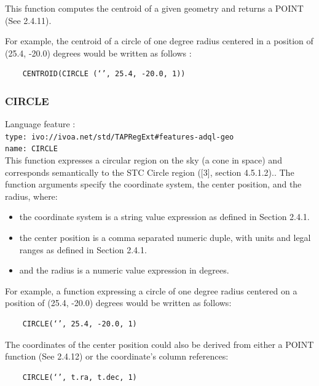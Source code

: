 \documentclass[11pt,a4paper]{ivoa}
\begin{document}
This function computes the centroid of a given geometry and returns a POINT
(See 2.4.11).

For example, the centroid of a circle of one degree radius centered in a
position of (25.4, -20.0) degrees would be written as follows :

\begin{verbatim}
    CENTROID(CIRCLE (‘’, 25.4, -20.0, 1))
\end{verbatim}

\subsubsection{CIRCLE}
\label{sec:geom.functions.circle}
{\footnotesize Language feature :}\\
{\footnotesize \verb|type: ivo://ivoa.net/std/TAPRegExt#features-adql-geo|}\\
{\footnotesize \verb|name: CIRCLE|}\\

This function expresses a circular region on the sky (a cone in space) and
corresponds semantically to the STC Circle region ([3], section 4.5.1.2).. The
function arguments specify the coordinate system, the center position,
and the radius, where:

\begin{itemize}
    \item the coordinate system is a string value expression as defined in Section 2.4.1.
    \item the center position is a comma separated numeric duple, with units and legal ranges as defined in Section 2.4.1.
    \item and the radius is a numeric value expression in degrees.
\end{itemize}

For example, a function expressing a circle of one degree radius centered on a
position of (25.4, -20.0) degrees would be written as follows:

\begin{verbatim}
    CIRCLE(‘’, 25.4, -20.0, 1)
\end{verbatim}

The coordinates of the center position could also be derived from either a
POINT function (See 2.4.12) or the coordinate’s column references:

\begin{verbatim}
    CIRCLE(‘’, t.ra, t.dec, 1)
\end{verbatim}
\end{document}
